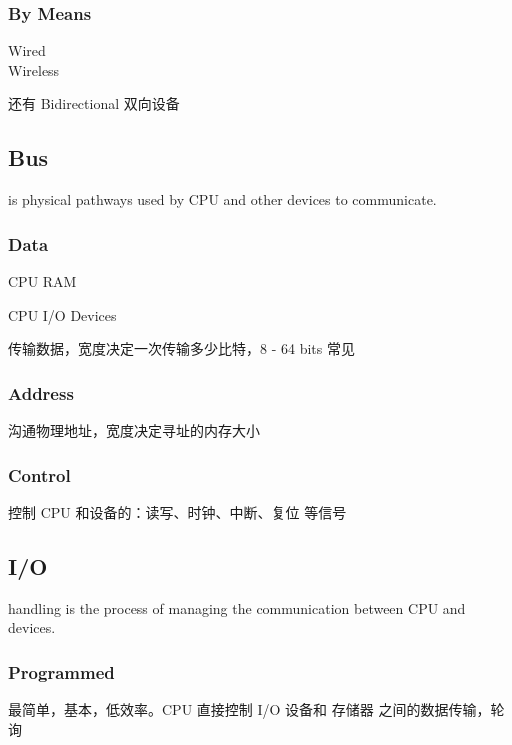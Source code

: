 \documentclass[11pt,journal,compsoc]{IEEEtran}
\begin{document}
\subsubsection{By Means}

\begin{description}
    \item[Wired]
    \item[Wireless]
\end{description}

还有 Bidirectional 双向设备


\subsection{Bus}

is physical pathways used by CPU and other devices to communicate.


\subsubsection{Data}

CPU \leftrightarrow RAM

CPU \leftrightarrow I/O Devices

传输数据，宽度决定一次传输多少比特，8 - 64 bits 常见


\subsubsection{Address}

沟通物理地址，宽度决定寻址的内存大小


\subsubsection{Control}

控制 CPU 和设备的：读写、时钟、中断、复位 等信号


\subsection{I/O}

handling is the process of managing the communication between CPU and devices.


\subsubsection{Programmed}

最简单，基本，低效率。CPU 直接控制 I/O 设备和 存储器 之间的数据传输，轮询
\end{document}
